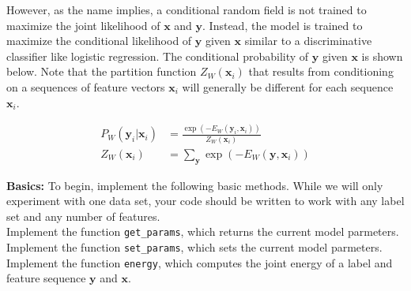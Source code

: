 \documentclass[11pt]{article}
\newcommand{\mbf}[1]{{\mathbf{#1}}}
\begin{document}
However, as the name implies, a conditional random field is not trained to maximize the joint likelihood of $\mbf{x}$ and $\mbf{y}$.
Instead, the model is trained to maximize the conditional likelihood of $\mbf{y}$ given $\mbf{x}$ similar to a
discriminative classifier like logistic regression. The conditional probability of $\mbf{y}$ given $\mbf{x}$ is shown below. Note that the
partition function $Z_W(\mbf{x}_i)$ that results from conditioning on a sequences of feature vectors $\mbf{x}_i$
will generally be different for each sequence $\mbf{x}_i$.

\begin{align*}
	P_{W}(\mbf{y}_i|\mbf{x}_i) &= \frac{\exp(-E_{W}(\mbf{y}_i, \mbf{x}_i))}{Z_W(\mbf{x}_i)}\\
	Z_W(\mbf{x}_i) & = \sum_{\mbf{y}} \exp(-E_{W}(\mbf{y}, \mbf{x}_i))
\end{align*}


\vspace{0.25in}
\begin{problem}{10} \textbf{Basics:} To begin, implement the following basic methods. While we will
only experiment with one data set, your code should be written to work with any label set
and any number of features.\\

 Implement the function \verb|get_params|, which returns the current model parmeters.\\

 Implement the function \verb|set_params|, which sets the current model parmeters.\\

 Implement the function \verb|energy|, which computes the joint energy of a label and feature sequence $\mbf{y}$ and $\mbf{x}$.
\end{problem}
\end{document}

